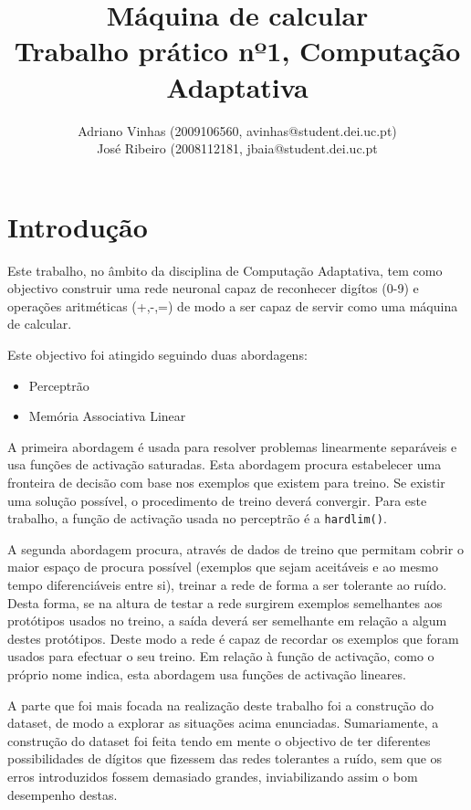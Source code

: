 \documentclass{article}
\begin{document}
\title{Máquina de calcular \\ Trabalho prático nº1, Computação Adaptativa}
\author{Adriano Vinhas (2009106560, avinhas@student.dei.uc.pt)\\
		José Ribeiro (2008112181, jbaia@student.dei.uc.pt}
\maketitle
\clearpage

\section{Introdução}

Este trabalho, no âmbito da disciplina de Computação Adaptativa, tem como objectivo construir uma rede neuronal capaz de reconhecer digítos (0-9) e operações aritméticas (+,-,=) de modo a ser capaz de servir como uma máquina de calcular.

Este objectivo foi atingido seguindo duas abordagens:
\begin{itemize}
\item Perceptrão
\item Memória Associativa Linear
\end{itemize}

A primeira abordagem é usada para resolver problemas linearmente separáveis e usa funções de activação saturadas. Esta abordagem procura estabelecer uma fronteira de decisão com base nos exemplos que existem para treino. Se existir uma solução possível, o procedimento de treino deverá convergir. Para este trabalho, a função de activação usada no perceptrão é a \texttt{hardlim()}.

A segunda abordagem procura, através de dados de treino que permitam cobrir o maior espaço de procura possível (exemplos que sejam aceitáveis e ao mesmo tempo diferenciáveis entre si), treinar a rede de forma a ser tolerante ao ruído. Desta forma, se na altura de testar a rede surgirem exemplos semelhantes aos protótipos usados no treino, a saída deverá ser semelhante em relação a algum destes protótipos. Deste modo a rede é capaz de recordar os exemplos que foram usados para efectuar o seu treino. Em relação à função de activação, como o próprio nome indica, esta abordagem usa funções de activação lineares.

A parte que foi mais focada na realização deste trabalho foi a construção do dataset, de modo a explorar as situações acima enunciadas. Sumariamente, a construção do dataset foi feita tendo em mente o objectivo de ter diferentes possibilidades de dígitos que fizessem das redes tolerantes a ruído, sem que os erros introduzidos fossem demasiado grandes, inviabilizando assim o bom desempenho destas.
\end{document}
